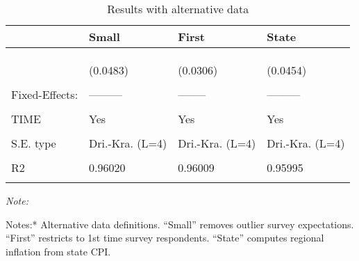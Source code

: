 \begin{table}

\caption{Results with alternative data }
\centering
\begin{threeparttable}
\begin{tabular}[t]{llll}
\toprule
  & Small & First & State\\
\midrule
\cellcolor{gray!6}{Dependent Var.:} & \cellcolor{gray!6}{RegInf} & \cellcolor{gray!6}{RegInf} & \cellcolor{gray!6}{RegInf}\\
\addlinespace
 &  &  & \\
\addlinespace
\cellcolor{gray!6}{pe} & \cellcolor{gray!6}{0.1401**} & \cellcolor{gray!6}{0.0695*} & \cellcolor{gray!6}{0.1199**}\\
\addlinespace
 & (0.0483) & (0.0306) & (0.0454)\\
\addlinespace
\cellcolor{gray!6}{Controls} & \cellcolor{gray!6}{Yes} & \cellcolor{gray!6}{Yes} & \cellcolor{gray!6}{Yes}\\
\addlinespace
Fixed-Effects: & --------- & -------- & ---------\\
\addlinespace
\cellcolor{gray!6}{REGION} & \cellcolor{gray!6}{Yes} & \cellcolor{gray!6}{Yes} & \cellcolor{gray!6}{Yes}\\
\addlinespace
TIME & Yes & Yes & Yes\\
\addlinespace
\cellcolor{gray!6}{\_\_\_\_\_\_\_\_\_\_\_\_\_\_\_} & \cellcolor{gray!6}{\_\_\_\_\_\_\_\_\_} & \cellcolor{gray!6}{\_\_\_\_\_\_\_\_} & \cellcolor{gray!6}{\_\_\_\_\_\_\_\_\_}\\
\addlinespace
S.E. type & Dri.-Kra. (L=4) & Dri.-Kra. (L=4) & Dri.-Kra. (L=4)\\
\addlinespace
\cellcolor{gray!6}{Observations} & \cellcolor{gray!6}{1,387} & \cellcolor{gray!6}{1,387} & \cellcolor{gray!6}{1,427}\\
\addlinespace
R2 & 0.96020 & 0.96009 & 0.95995\\
\addlinespace
\cellcolor{gray!6}{Within R2} & \cellcolor{gray!6}{0.61445} & \cellcolor{gray!6}{0.61342} & \cellcolor{gray!6}{0.62801}\\
\bottomrule
\end{tabular}
\begin{tablenotes}
\item \textit{Note: } 
\item *Notes:* Alternative data definitions.  ``Small'' removes outlier survey expectations. ``First'' restricts to 1st time survey respondents. ``State'' computes regional inflation from state CPI.
\end{tablenotes}
\end{threeparttable}
\end{table}
